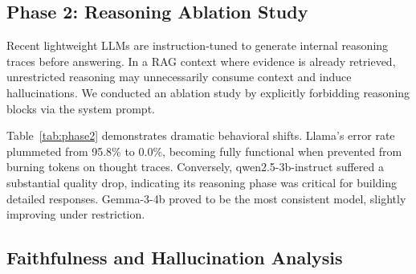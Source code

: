 \documentclass[conference]{IEEEtran}
\begin{document}
\subsection{Phase 2: Reasoning Ablation Study}
\label{sec:phase2}

Recent lightweight LLMs are instruction-tuned to generate internal reasoning traces before answering. In a RAG context where evidence is already retrieved, unrestricted reasoning may unnecessarily consume context and induce hallucinations. We conducted an ablation study by explicitly forbidding reasoning blocks via the system prompt.

\begin{table}[!t]
\centering
\caption{Phase 2: Reasoning Ablation (Restricted Reasoning)}
\label{tab:phase2}
\renewcommand{\arraystretch}{1.2}
\end{table}

Table~\ref{tab:phase2} demonstrates dramatic behavioral shifts. Llama's error rate plummeted from 95.8\% to 0.0\%, becoming fully functional when prevented from burning tokens on thought traces. Conversely, qwen2.5-3b-instruct suffered a substantial quality drop, indicating its reasoning phase was critical for building detailed responses. Gemma-3-4b proved to be the most consistent model, slightly improving under restriction.

\subsection{Faithfulness and Hallucination Analysis}
\label{sec:hallucination}
\end{document}
